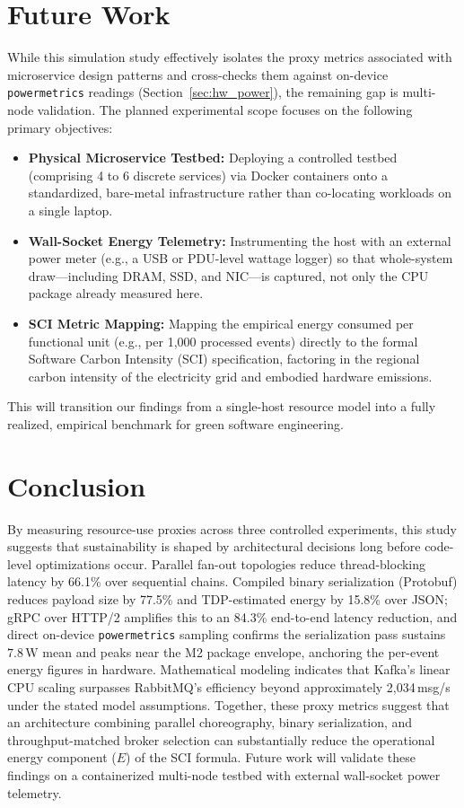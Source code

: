 \documentclass[conference]{IEEEtran}
\begin{document}
\section{Future Work}
While this simulation study effectively isolates the proxy metrics associated with microservice design patterns and cross-checks them against on-device \texttt{powermetrics} readings (Section~\ref{sec:hw_power}), the remaining gap is multi-node validation. The planned experimental scope focuses on the following primary objectives:
\begin{itemize}
    \item \textbf{Physical Microservice Testbed:} Deploying a controlled testbed (comprising 4 to 6 discrete services) via Docker containers onto a standardized, bare-metal infrastructure rather than co-locating workloads on a single laptop.
    \item \textbf{Wall-Socket Energy Telemetry:} Instrumenting the host with an external power meter (e.g., a USB or PDU-level wattage logger) so that whole-system draw---including DRAM, SSD, and NIC---is captured, not only the CPU package already measured here.
    \item \textbf{SCI Metric Mapping:} Mapping the empirical energy consumed per functional unit (e.g., per 1,000 processed events) directly to the formal Software Carbon Intensity (SCI) specification, factoring in the regional carbon intensity of the electricity grid and embodied hardware emissions.
\end{itemize}
This will transition our findings from a single-host resource model into a fully realized, empirical benchmark for green software engineering.

\section{Conclusion}
By measuring resource-use proxies across three controlled experiments, this study suggests that sustainability is shaped by architectural decisions long before code-level optimizations occur. Parallel fan-out topologies reduce thread-blocking latency by 66.1\% over sequential chains. Compiled binary serialization (Protobuf) reduces payload size by 77.5\% and TDP-estimated energy by 15.8\% over JSON; gRPC over HTTP/2 amplifies this to an 84.3\% end-to-end latency reduction, and direct on-device \texttt{powermetrics} sampling confirms the serialization pass sustains $7.8\,\text{W}$ mean and peaks near the M2 package envelope, anchoring the per-event energy figures in hardware. Mathematical modeling indicates that Kafka's linear CPU scaling surpasses RabbitMQ's efficiency beyond approximately 2,034\,msg/s under the stated model assumptions. Together, these proxy metrics suggest that an architecture combining parallel choreography, binary serialization, and throughput-matched broker selection can substantially reduce the operational energy component ($E$) of the SCI formula. Future work will validate these findings on a containerized multi-node testbed with external wall-socket power telemetry.
\end{document}
